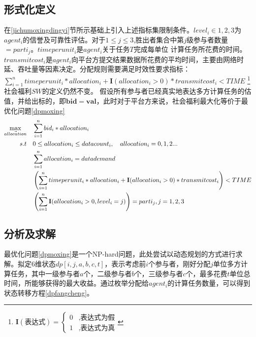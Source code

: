 \documentclass[promaster]{thesis-uestc}
\begin{document}
\subsection{形式化定义}
\label{dpdingyi}
在\ref{jichumoxingdingyi}节所示基础上引入上述指标集限制条件。$level_i\in {1,2,3}$为$agent_i$的信誉及可靠性评估。对于$1\leq j \leq 3$,胜出者集合中第$j$级参与者数量$=parti_j$。$timeperunit_i$是$agent_i$关于$任务T$完成每单位
计算任务所花费的时间。$transmitcost_i$是$agent_i$向平台方提交结果数据所花费的平均时间，主要由网络时延、吞吐量等因素决定。分配规则需要满足时效性要求指标：$\sum_{i=1}^{n}{timeperunit_i*allocation_i+\mathbf{I}(allocation_i > 0)*transmitcost_i} < TIME$
\footnote{$\mathbf{I}(\text{表达式}) = \begin{cases}{}
        0&,\text{表达式为假}\\
        1&,\text{表达式为真}
        \end{cases}$
}%
社会福利$SW$的定义仍然不变。
假设所有参与者已经真实地表达多方计算任务的估值，并给出标的，即$\mathbf{bid} = \mathbf{val}$，此时对于平台方来说，社会福利最大化等价于最优化问题\ref{dpmoxing}
\begin{align}
    \label{dpmoxing}\max_{\vec{allocation}} \quad&\sum_{i=1}^{n}{bid_i*allocation_i}\\
    s.t\quad& 0\leq allocation_i\leq datacount_i,\quad allocation_i = {0,1,2...}\notag\\
        \quad& \sum_{i=1}^{n}{allocation_i} = datademand\notag\\
        \quad& \left(\sum_{i=1}^{n}{timeperunit_i*allocation_i+\mathbf{I}(allocation_i > 0)*transmitcost_i}\right) < TIME\notag\\
        \quad& \left(\sum_{i=1}^{n}{\mathbf{I}(allocation_i > 0,level_i = j)}\right)=parti_j, j = {1,2,3}\notag
\end{align}

\subsection{分析及求解}
最优化问题\ref{dpmoxing}是一个NP-hard问题，此处尝试以动态规划的方式进行求解。拟定6维状态$dp[i,j,a,b,c,t]$，表示考虑前$i$个参与者，刚好分配$j$单位多方计算任务，其中一级参与者$a$个，二级参与者$b$个，三级参与者$c$个，最多花费$t$单位总时间，所能够获得的最大收益。通过枚举分配给$agent_i$的计算任务数量，可以得到状态转移方程\ref{dpfangcheng}。
\end{document}
